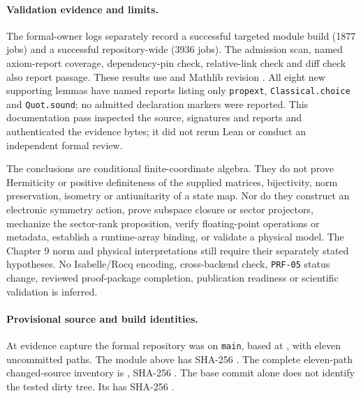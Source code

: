 \paragraph{Validation evidence and limits.}
The formal-owner logs separately record a successful targeted module build
(1877 jobs) and a successful repository-wide  (3936 jobs).
The admission scan, named axiom-report coverage, dependency-pin check,
relative-link check and diff check also report passage. These results use
 and Mathlib revision
. All eight new supporting
lemmas have named reports listing only \texttt{propext},
\texttt{Classical.choice} and \texttt{Quot.sound}; no admitted declaration
markers were reported. This documentation pass inspected the source,
signatures and reports and authenticated the evidence bytes; it did not rerun
Lean or conduct an independent formal review.

The conclusions are conditional finite-coordinate algebra. They do not prove
Hermiticity or positive definiteness of the supplied matrices, bijectivity,
norm preservation, isometry or antiunitarity of a state map. Nor do they
construct an electronic symmetry action, prove subspace closure or sector
projectors, mechanize the sector-rank proposition, verify floating-point
operations or metadata, establish a runtime-array binding, or validate a
physical model. The Chapter 9 norm and physical interpretations still require
their separately stated hypotheses. No Isabelle/Rocq encoding, cross-backend
check, \texttt{PRF-05} status change, reviewed proof-package completion,
publication readiness or scientific validation is inferred.

\paragraph{Provisional source and build identities.}
At evidence capture the formal repository was on \texttt{main}, based at
, with eleven uncommitted
paths. The module above has SHA-256
.
The complete eleven-path changed-source inventory is
, SHA-256
.
The base commit alone does not identify the tested dirty tree. Its
 has SHA-256
.

